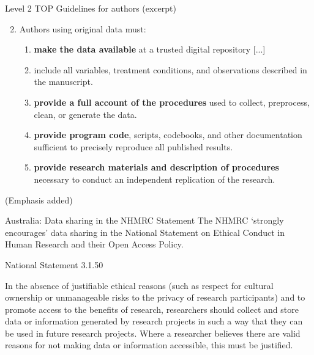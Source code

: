 \documentclass[aspectratio=169, 11pt]{beamer} %
\begin{document}
\begin{frame}{Level 2 TOP Guidelines for authors (excerpt)}
  
    \begin{enumerate}[label=\arabic*.]
        \setcounter{enumi}{1}
        
        \item Authors using original data must:
        \begin{enumerate}[label=\alph*.]
            \item \textbf{make the data available} at a trusted digital repository [...]
            \item include all variables, treatment conditions, and observations described in the manuscript.
            \item \textbf{provide a full account of the procedures} used to collect, preprocess, clean, or generate the data.
            \item \textbf{provide program code}, scripts, codebooks, and other documentation sufficient to precisely reproduce all published results.
            \item \textbf{provide research materials and description of procedures} necessary to conduct an independent replication of the research.
        \end{enumerate}
    \end{enumerate}
    (Emphasis added) \cite{Osf2014-pf}
\end{frame}

\begin{frame}{Australia: Data sharing in the NHMRC Statement}
    The NHMRC `strongly encourages' data sharing in the National Statement on Ethical Conduct in Human Research and their Open Access Policy. \cite{Nhmrc2018-sj, Nhmrc2018-vn} \par
    National Statement 3.1.50 \par
    In the absence of justifiable ethical reasons (such as respect for cultural ownership or unmanageable risks to the privacy of research participants) and to promote access to the benefits of research, researchers should collect and store data or information generated by research projects in such a way that they can be used in future research projects. Where a researcher believes there are valid reasons for not making data or information accessible, this must be justified.
\end{frame}
\end{document}
